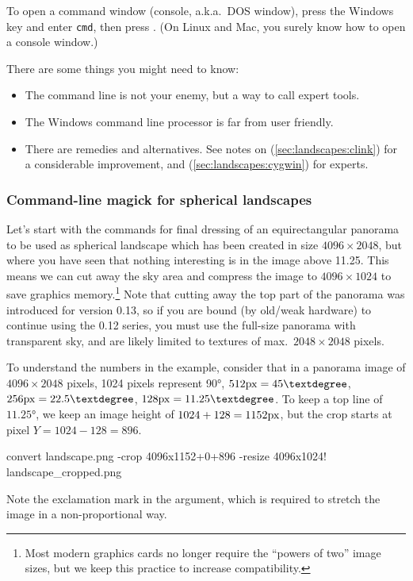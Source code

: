 To open a command window (console, a.k.a.\ DOS window), press the
Windows key and enter \texttt{cmd}, then press \key{\return}. (On Linux and Mac, you
surely know how to open a console window.)

There are some  things you might need to know: 
\begin{itemize}
\item The command line is not your enemy, but a way to call expert tools.
\item The Windows command line processor  is far from user friendly.
\item There are remedies and alternatives. See notes on  (\ref{sec:landscapes:clink})
  for a considerable improvement, and  (\ref{sec:landscapes:cygwin}) for experts.
\end{itemize}



\subsubsection{Command-line magick for spherical landscapes}
\label{sec:landscapes:ImageMagic:spherical}

Let's start with the commands for final dressing of an equirectangular
panorama to be used as spherical landscape which has been created in
size $4096\times2048$, but where you have seen that nothing interesting 
is in the image above 11.25\degree. This means we can cut away the sky area
and compress the image to $4096\times1024$ to save graphics memory.\footnote{Most
modern graphics cards no longer require the ``powers of two''
image sizes, but we keep this practice to increase compatibility.} Note
that cutting away the top part of the panorama was introduced for
version 0.13, so if you are bound (by old/weak hardware) to continue
using the 0.12 series, you must use the full-size panorama with
transparent sky, and are likely limited to textures of
max.\ $2048\times2048$ pixels.

To understand the numbers in the example, consider that in a panorama
image of $4096\times2048$ pixels, 1024 pixels represent 90°,
$512\px=45°$, $256\px=22.5°$, $128\px=11.25°$. To keep a top
line of $11.25°$, we keep an image height of $1024+128=1152\px$, but the crop starts at pixel $Y=1024-128=896$.

\begin{commands}
convert landscape.png -crop 4096x1152+0+896 
        -resize 4096x1024! landscape_cropped.png
\end{commands}
%      
Note the exclamation mark in the  argument, which is required to
stretch the image in a non-proportional way.

